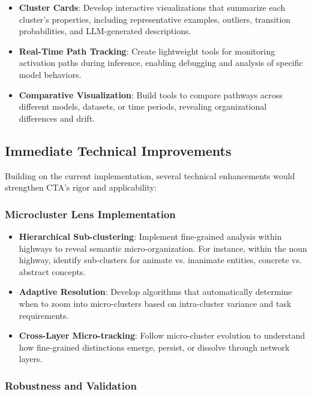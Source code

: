 \begin{itemize}
    \item \textbf{Cluster Cards}: Develop interactive visualizations that summarize each cluster's properties, including representative examples, outliers, transition probabilities, and LLM-generated descriptions.
    
    \item \textbf{Real-Time Path Tracking}: Create lightweight tools for monitoring activation paths during inference, enabling debugging and analysis of specific model behaviors.
    
    \item \textbf{Comparative Visualization}: Build tools to compare pathways across different models, datasets, or time periods, revealing organizational differences and drift.
\end{itemize}

\subsection{Immediate Technical Improvements}

Building on the current implementation, several technical enhancements would strengthen CTA's rigor and applicability:

\subsubsection{Microcluster Lens Implementation}

\begin{itemize}
    \item \textbf{Hierarchical Sub-clustering}: Implement fine-grained analysis within highways to reveal semantic micro-organization. For instance, within the noun highway, identify sub-clusters for animate vs. inanimate entities, concrete vs. abstract concepts.
    
    \item \textbf{Adaptive Resolution}: Develop algorithms that automatically determine when to zoom into micro-clusters based on intra-cluster variance and task requirements.
    
    \item \textbf{Cross-Layer Micro-tracking}: Follow micro-cluster evolution to understand how fine-grained distinctions emerge, persist, or dissolve through network layers.
\end{itemize}

\subsubsection{Robustness and Validation}

